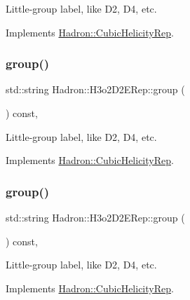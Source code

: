 Little-\/group label, like D2, D4, etc. 

Implements \mbox{\hyperlink{structHadron_1_1CubicHelicityRep_a101a7d76cd8ccdad0f272db44b766113}{Hadron\+::\+Cubic\+Helicity\+Rep}}.

\mbox{\label{structHadron_1_1H3o2D2ERep_ad9d9eb7585ef277acd3efb48c5912c95}} 
\subsubsection{\texorpdfstring{group()}{group()}\hspace{0.1cm}{\footnotesize\ttfamily [3/5]}}
{\footnotesize\ttfamily std\+::string Hadron\+::\+H3o2\+D2\+E\+Rep\+::group (\begin{DoxyParamCaption}{ }\end{DoxyParamCaption}) const\hspace{0.3cm}{\ttfamily [inline]}, {\ttfamily [virtual]}}

Little-\/group label, like D2, D4, etc. 

Implements \mbox{\hyperlink{structHadron_1_1CubicHelicityRep_a101a7d76cd8ccdad0f272db44b766113}{Hadron\+::\+Cubic\+Helicity\+Rep}}.

\mbox{\label{structHadron_1_1H3o2D2ERep_ad9d9eb7585ef277acd3efb48c5912c95}} 
\subsubsection{\texorpdfstring{group()}{group()}\hspace{0.1cm}{\footnotesize\ttfamily [4/5]}}
{\footnotesize\ttfamily std\+::string Hadron\+::\+H3o2\+D2\+E\+Rep\+::group (\begin{DoxyParamCaption}{ }\end{DoxyParamCaption}) const\hspace{0.3cm}{\ttfamily [inline]}, {\ttfamily [virtual]}}

Little-\/group label, like D2, D4, etc. 

Implements \mbox{\hyperlink{structHadron_1_1CubicHelicityRep_a101a7d76cd8ccdad0f272db44b766113}{Hadron\+::\+Cubic\+Helicity\+Rep}}.

